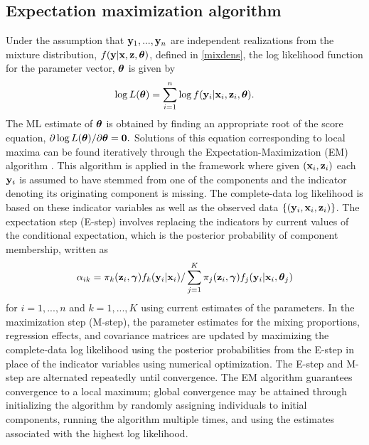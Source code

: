 \subsection{Expectation maximization algorithm}
Under the assumption that $\mathbf y_{1},...,\mathbf y_{n}$ are independent realizations from the mixture distribution, $f(\mathbf y | \mathbf x, \mathbf z, \boldsymbol\theta)$, defined in \ref{mixdens}, the log likelihood function for the parameter vector, $\boldsymbol \theta$ is given by
$$\log L(\boldsymbol\theta)=\sum^{n}_{i=1}\log f(\mathbf y_{i}|\mathbf x_{i},\mathbf z_{i},\boldsymbol \theta).$$
The ML estimate of $\boldsymbol\theta$ is obtained by finding an appropriate root of the score equation, $\partial \log L(\boldsymbol\theta)/\partial \boldsymbol\theta=\mathbf 0.$
Solutions of this equation corresponding to local maxima can be found iteratively through the Expectation-Maximization (EM) algorithm \cite{dempster1977}. This algorithm is applied in the framework where given $(\mathbf x_{i},\mathbf z_{i})$ each $\mathbf y_{i}$ is assumed to have stemmed from one of the components and the indicator denoting its originating component is missing. The complete-data log likelihood is based on these indicator variables as well as the observed data $\{(\mathbf y_{i}, \mathbf x_{i}, \mathbf z_{i})\}$. The expectation step (E-step) involves replacing the indicators by current values of the conditional expectation, which is the posterior probability of component membership, written as
$$\alpha_{ik}=\pi_{k}(\mathbf z_{i},\boldsymbol\gamma)f_{k}(\mathbf y_{i}|\mathbf x_{i})/\sum_{j=1}^{K}\pi_{j}(\mathbf z_{i},\boldsymbol\gamma)f_{j}(\mathbf y_{i}|\mathbf x_{i},\boldsymbol \theta_{j})$$
for $i=1,...,n$ and $k=1,...,K$ using current estimates of the parameters. In the maximization step (M-step), the parameter estimates for the mixing proportions, regression effects, and covariance matrices are updated by maximizing the complete-data log likelihood using the posterior probabilities from the E-step in place of the indicator variables using numerical optimization. The E-step and M-step are alternated repeatedly until convergence. The EM algorithm guarantees convergence to a local maximum; global convergence may be attained through initializing the algorithm by randomly assigning individuals to initial components, running the algorithm multiple times, and using the estimates associated with the highest log likelihood.

